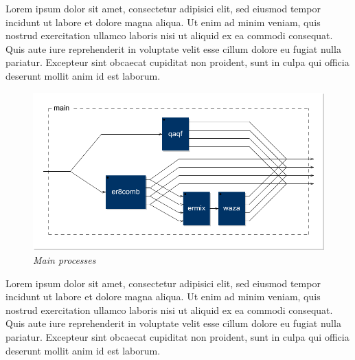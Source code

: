 \documentclass[twoside,a4paper]{article}
\begin{document}
Lorem ipsum dolor sit amet, consectetur adipisici elit, sed eiusmod tempor
incidunt ut labore et dolore magna aliqua. Ut enim ad minim veniam, quis
nostrud exercitation ullamco laboris nisi ut aliquid ex ea commodi consequat.
Quis aute iure reprehenderit in voluptate velit esse cillum dolore eu fugiat
nulla pariatur. Excepteur sint obcaecat cupiditat non proident, sunt in culpa
qui officia deserunt mollit anim id est laborum.

\begin{figure}[ht]
\centerline{\includegraphics[scale=0.5]{img/main}}
\caption{\label{ml-main}{\it Main processes}}
\end{figure}

Lorem ipsum dolor sit amet, consectetur adipisici elit, sed eiusmod tempor
incidunt ut labore et dolore magna aliqua. Ut enim ad minim veniam, quis
nostrud exercitation ullamco laboris nisi ut aliquid ex ea commodi consequat.
Quis aute iure reprehenderit in voluptate velit esse cillum dolore eu fugiat
nulla pariatur. Excepteur sint obcaecat cupiditat non proident, sunt in culpa
qui officia deserunt mollit anim id est laborum.
\end{document}
